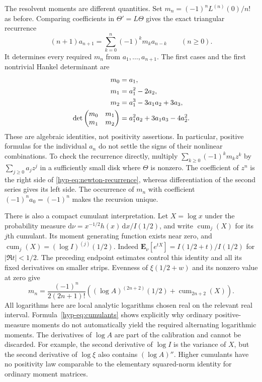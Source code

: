 \documentclass[11pt,a4paper]{article}
\numberwithin{equation}{section}
\theoremstyle{definition}
\theoremstyle{remark}
\begin{document}
The resolvent moments are different quantities. Set
$m_n=(-1)^nL^{(n)}(0)/n!$ as before. Comparing coefficients in
$\Theta'=L\Theta$ gives the exact triangular recurrence
\begin{equation}\label{hyp-eq:newton-recurrence}
(n+1)a_{n+1}=\sum_{k=0}^{n}(-1)^km_k a_{n-k}
\qquad(n\geq0).
\end{equation}
It determines every required $m_n$ from $a_1,\ldots,a_{n+1}$.
The first cases and the first nontrivial Hankel determinant are
\begin{align}
m_0&=a_1,\notag\\
m_1&=a_1^2-2a_2,\notag\\
m_2&=a_1^3-3a_1a_2+3a_3,\label{hyp-eq:first-moments}\\
\det\begin{pmatrix}m_0&m_1\\m_1&m_2\end{pmatrix}
&=a_1^2a_2+3a_1a_3-4a_2^2.
\label{hyp-eq:first-hankel}
\end{align}
These are algebraic identities, not positivity assertions.
In particular, positive formulas for the individual $a_n$ do not
settle the signs of their nonlinear combinations. To check the
recurrence directly, multiply
$\sum_{k\geq0}(-1)^km_kz^k$ by
$\sum_{j\geq0}a_jz^j$ in a sufficiently small disk where
$\Theta$ is nonzero. The coefficient of $z^n$ is the right side
of \eqref{hyp-eq:newton-recurrence}, whereas differentiation of the
second series gives its left side. The occurrence of $m_n$ with
coefficient $(-1)^na_0=(-1)^n$ makes the recursion unique.

There is also a compact cumulant interpretation. Let $X=\log x$
under the probability measure
$\mathrm d\nu=x^{-1/2}h(x)\,\mathrm dx/I(1/2)$, and write
$\operatorname{cum}_j(X)$ for its $j$th cumulant. Its moment
generating function exists near zero, and
$\operatorname{cum}_j(X)=(\log I)^{(j)}(1/2)$.
Indeed $\mathbf E_\nu[e^{tX}]=I(1/2+t)/I(1/2)$ for
$|\Re t|<1/2$. The preceding endpoint estimates control this
identity and all its fixed derivatives on smaller strips.
Evenness of $\xi(1/2+w)$ and its nonzero value at zero give
\begin{equation}\label{hyp-eq:cumulants}
m_n=\frac{(-1)^n}{2(2n+1)!}
\left((\log A)^{(2n+2)}(1/2)
+\operatorname{cum}_{2n+2}(X)\right).
\end{equation}
All logarithms here are local analytic logarithms chosen real on
the relevant real interval. Formula~\eqref{hyp-eq:cumulants}
shows explicitly why ordinary positive-measure moments do not
automatically yield the required alternating logarithmic moments.
The derivatives of $\log A$ are part of the calibration and cannot
be discarded. For example, the second derivative of $\log I$ is
the variance of $X$, but the second derivative of $\log\xi$
also contains $(\log A)''$. Higher cumulants have no positivity
law comparable to the elementary squared-norm identity for ordinary
moment matrices.
\end{document}
